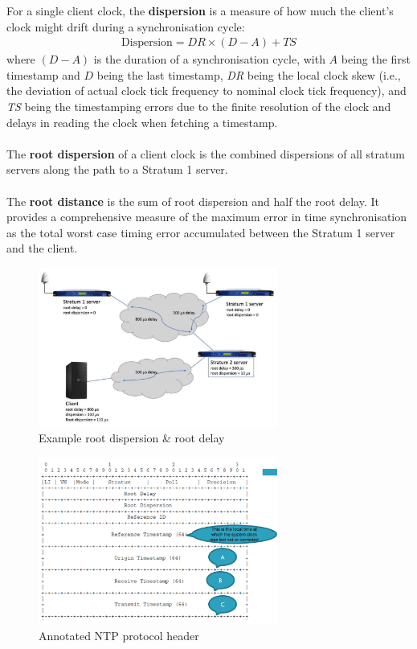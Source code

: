 \documentclass[a4paper,11pt]{article}
\begin{document}
For a single client clock, the \textbf{dispersion} is a measure of how much the client's clock might drift during a synchronisation cycle:
\begin{align*}
    \text{Dispersion} = \textit{DR} \times (D-A) + \textit{TS}
\end{align*}
where $(D-A)$ is the duration of a synchronisation cycle, with $A$ being the first timestamp and $D$ being the last timestamp, \textit{DR} being the local clock skew (i.e., the deviation of actual clock tick frequency to nominal clock tick frequency), and \textit{TS} being the timestamping errors due to the finite resolution of the clock and delays in reading the clock when fetching a timestamp.
\\\\
The \textbf{root dispersion} of a client clock is the combined dispersions of all stratum servers along the path to a Stratum 1 server.
\\\\
The \textbf{root distance} is the sum of root dispersion and half the root delay.
It provides a comprehensive measure of the maximum error in time synchronisation as the total worst case timing error accumulated between the Stratum 1 server and the client.

\begin{figure}[H]
    \centering
    \includegraphics[width=0.7\textwidth]{./images/rootdispersion.png}
    \caption{ Example root dispersion \& root delay }
\end{figure}

\begin{figure}[H]
    \centering
    \includegraphics[width=0.7\textwidth]{./images/annotatedntpheader.png}
    \caption{ Annotated NTP protocol header }
\end{figure}
\end{document}
